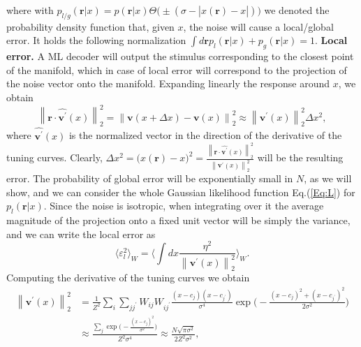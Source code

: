 \documentclass[a4paper]{article}%
\begin{document}
where with $p_{l/g}(\mathbf{r}|x) = p(\mathbf{r}|x) \Theta\big(\pm(\sigma-
|\hat{x}(\mathbf{r})-x|)\big)$ we denoted the probability density function
that, given $x$, the noise will cause a local/global error. It holds the
following normalization $\int d\mathbf{r} p_{l}(\mathbf{r}|x) + p_{g}%
(\mathbf{r}|x)=1$. \newline\newline\textbf{Local error.} A ML decoder will
output the stimulus corresponding to the closest point of the manifold, which
in case of local error will correspond to the projection of the noise vector
onto the manifold. Expanding linearly the response around $x$, we obtain
\begin{equation}
\left\|  \mathbf{r}\cdot\hat{\mathbf{v^{\prime}}}(x)\right\| _{2}^{2}
=\left\|  \mathbf{v}(x+\Delta x)-\mathbf{v}(x)\right\| _{2}^{2} \approx\left\|
\mathbf{v^{\prime}}(x)\right\| _{2}^{2}\Delta x^{2},
\end{equation}
where $\hat{\mathbf{v^{\prime}}}(x)$ is the normalized vector in the direction
of the derivative of the tuning curves. Clearly, $\Delta x^{2} = \big(\hat
{x}(\mathbf{r})-x\big)^{2} = \frac{\left\|  \mathbf{r}\cdot\hat
{\mathbf{v^{\prime}}}(x)\right\| _{2}^{2}}{\left\| \mathbf{v^{\prime}%
}(x)\right\| _{2}^{2}}$ will be the resulting error. The probability of global
error will be exponentially small in $N$, as we will show, and we can consider
the whole Gaussian likelihood function Eq.(\ref{Eq:L}) for $p_{l}%
(\mathbf{r}|x)$. Since the noise is isotropic, when integrating over it the
average magnitude of the projection onto a fixed unit vector will be simply
the variance, and we can write the local error as
\begin{equation}
\langle\varepsilon_{l}^{2}\rangle_{W} = \langle\int dx \frac{\eta^{2}%
}{\left\|  \mathbf{v^{\prime}}(x)\right\| _{2}^{2}}\rangle_{W}.
\end{equation}
Computing the derivative of the tuning curves we obtain
\begin{equation}%
\begin{split}
\left\|  \mathbf{v^{\prime}}(x)\right\| _{2}^{2}  & = \frac{1}{Z^{2}} \sum_{i}
\sum_{jj^{\prime}} W_{ij}W_{ij^{\prime}}\frac{(x-c_{j})(x-c_{j^{\prime}}%
)}{\sigma^{4}} \exp\Big(-\frac{(x-c_{j})^{2}+(x-c_{j^{\prime}})^{2}}%
{2\sigma^{2}}\Big)\\
&  \approx\frac{\sum_{j}\exp\Big(-\frac{(x-c_{j})^{2}}{\sigma^{2}}%
\Big) }{Z^{2}\sigma^{4}}\approx\frac{N \sqrt{\pi\sigma^{2}}}{2 Z^{2}\sigma
^{2}},
\end{split}
\label{Eq:tcd}%
\end{equation}
\end{document}
